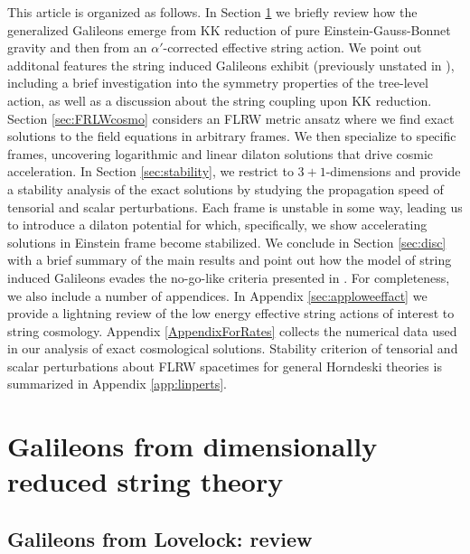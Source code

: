\documentclass[amsmath,amssymb,11pt]{article}
\begin{document}
This article is organized as follows. In Section \ref{sec:review} we briefly review how the generalized Galileons emerge from KK reduction of pure Einstein-Gauss-Bonnet gravity and then from an $\alpha'$-corrected effective string action. We point out additonal features the string induced Galileons exhibit (previously unstated in \cite{Easson:2020bgk}), including a brief investigation into the symmetry properties of the tree-level action, as well as a discussion about the string coupling upon KK reduction. Section \ref{sec:FRLWcosmo} considers an FLRW metric ansatz where we find exact solutions to the field equations in arbitrary frames. We then specialize to specific frames, uncovering logarithmic and linear dilaton solutions that drive cosmic acceleration. In Section \ref{sec:stability}, we restrict to $3+1$-dimensions and provide a stability analysis of the exact solutions by studying the propagation speed of tensorial and scalar perturbations.  Each frame is unstable in some way, leading us to introduce a dilaton potential for which, specifically, we show accelerating solutions in Einstein frame become stabilized. We conclude in Section \ref{sec:disc} with a brief summary of the main results and point out how the model of string induced Galileons evades the no-go-like criteria presented in \cite{Montefalcone:2020vlu}. For completeness, we also include a number of appendices. In Appendix \ref{sec:apploweeffact} we provide a lightning review of the low energy effective string actions of interest to string cosmology. Appendix \ref{AppendixForRates} collects the numerical data used in our analysis of exact cosmological solutions. Stability criterion of tensorial and scalar perturbations about FLRW spacetimes for general Horndeski theories is summarized in Appendix \ref{app:linperts}.







\section{Galileons from dimensionally reduced string theory} \label{sec:review}

\subsection{Galileons from Lovelock: review}
\end{document}
